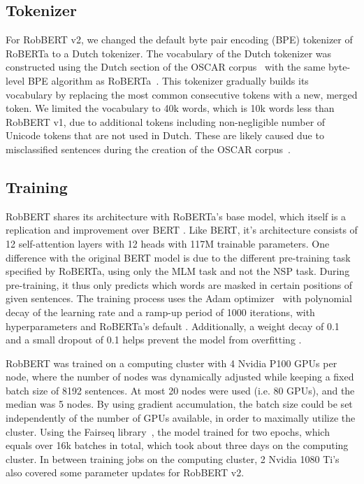 \documentclass[11pt,a4paper]{article}
\begin{document}
\subsection{Tokenizer}

For RobBERT v2, we changed the default byte pair encoding (BPE) tokenizer of RoBERTa to a Dutch tokenizer.
The vocabulary of the Dutch tokenizer was constructed using the Dutch section of the OSCAR corpus~\citep{ortizsuarezAsynchronous2019} with the same byte-level BPE algorithm as RoBERTa~\citep{liuRoBERTa2019}. This tokenizer gradually builds its vocabulary by replacing the most common consecutive tokens with a new, merged token.
We limited the vocabulary to 40k words, which is 10k words less than RobBERT v1, due to additional tokens including non-negligible number of Unicode tokens that are not used in Dutch.
These are likely caused due to misclassified sentences during the creation of the OSCAR corpus~\citep{ortizsuarezAsynchronous2019}.


\subsection{Training}

RobBERT shares its architecture with RoBERTa's base model, which itself is a replication and improvement over BERT \citep{liuRoBERTa2019}.
Like BERT, it's architecture consists of 12 self-attention layers with 12 heads \citep{devlinBERT2019a} with 117M trainable parameters.
One difference with the original BERT model is due to the different pre-training task specified by RoBERTa, using only the MLM task and not the NSP task.
During pre-training, it thus only predicts which words are masked in certain positions of given sentences.
The training process uses the Adam optimizer~\citep{kingmaAdam2017} with polynomial decay of the learning rate  and a ramp-up period of 1000 iterations, with hyperparameters  and RoBERTa's default .
Additionally, a weight decay of 0.1 and a small dropout of 0.1 helps prevent the model from overfitting \citep{srivastavaDropout2014}. 


RobBERT was trained on a computing cluster with 4 Nvidia P100 GPUs per node, where the number of nodes was dynamically adjusted while keeping a fixed batch size of 8192 sentences.
At most 20 nodes were used (i.e. 80 GPUs), and the median was 5 nodes. By using gradient accumulation, the batch size could be set independently of the number of GPUs available, in order to maximally utilize the cluster. Using the Fairseq library~\citep{ott2019fairseq}, the model trained for two epochs, which equals over 16k batches in total, which took about three days on the computing cluster.
In between training jobs on the computing cluster, 2 Nvidia 1080 Ti's also covered some parameter updates for RobBERT v2.
\end{document}
